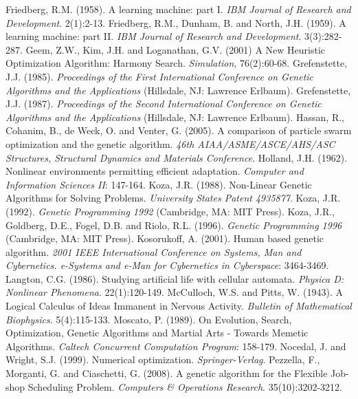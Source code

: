 \documentclass[spanish,a4paper,12pt,twoside]{report}
\begin{document}
\begin{thebibliography}{00}
   Friedberg, R.M. (1958). A learning machine: part I. \emph{IBM Journal of Research and Development}. 2(1):2-13.
   Friedberg, R.M., Dunham, B. and North, J.H. (1959). A learning machine: part II. \emph{IBM Journal of Research and Development}. 3(3):282-287.
   Geem, Z.W., Kim, J.H. and Loganathan, G.V. (2001) A New Heuristic Optimization Algorithm: Harmony Search. \emph{Simulation}, 76(2):60-68.
   Grefenstette, J.J. (1985). \emph{Proceedings of the First International Conference on Genetic Algorithms and the Applications} (Hillsdale, NJ: Lawrence Erlbaum).
   Grefenstette, J.J. (1987). \emph{Proceedings of the Second International Conference on Genetic Algorithms and the Applications} (Hillsdale, NJ: Lawrence Erlbaum).
   Hassan, R., Cohanim, B., de Weck, O. and Venter, G. (2005). A comparison of particle swarm optimization and the genetic algorithm. \emph{46th AIAA/ASME/ASCE/AHS/ASC Structures, Structural Dynamics and Materials Conference}.
   Holland, J.H. (1962). Nonlinear environments permitting efficient adaptation. \emph{Computer and Information Sciences II}: 147-164.
   Koza, J.R. (1988). Non-Linear Genetic Algorithms for Solving Problems. \emph{University States Patent 4935877}.
   Koza, J.R. (1992). \emph{Genetic Programming 1992} (Cambridge, MA: MIT Press).
   Koza, J.R., Goldberg, D.E., Fogel, D.B. and Riolo, R.L. (1996). \emph{Genetic Programming 1996} (Cambridge, MA: MIT Press).
   Kosorukoff, A. (2001). Human based genetic algorithm. \emph{2001 IEEE International Conference on Systems, Man and Cybernetics. e-Systems and e-Man for Cybernetics in Cyberspace}: 3464-3469.
   Langton, C.G. (1986). Studying artificial life with cellular automata. \emph{Physica D: Nonlinear Phenomena}. 22(1):120-149.
   McCulloch, W.S. and Pitts, W. (1943). A Logical Calculus of Ideas Immanent in Nervous Activity. \emph{Bulletin of Mathematical Biophysics}. 5(4):115-133.
   Moscato, P. (1989). On Evolution, Search, Optimization, Genetic Algorithms and Martial Arts - Towards Memetic Algorithms. \emph{Caltech Concurrent Computation Program}: 158-179.
   Nocedal, J. and Wright, S.J. (1999). Numerical optimization. \emph{Springer-Verlag}.
   Pezzella, F., Morganti, G. and Ciaschetti, G. (2008). A genetic algorithm for the Flexible Job-shop Scheduling Problem. \emph{Computers \& Operations Research}. 35(10):3202-3212.

\end{thebibliography}
\end{document}

